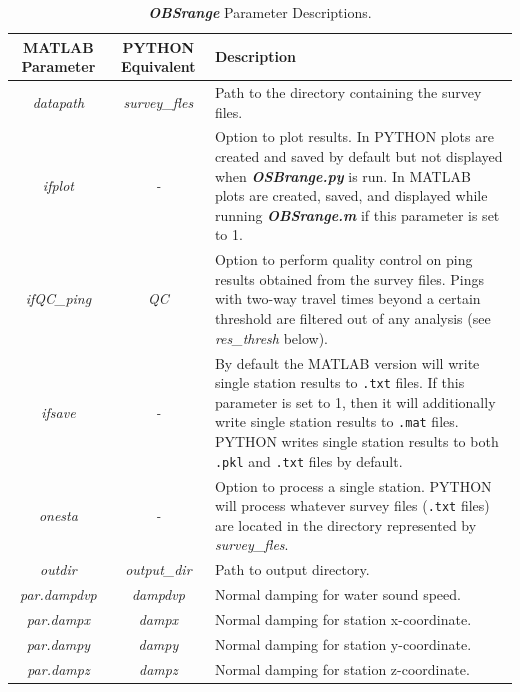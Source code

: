 \documentclass[titlepage, 12pt]{article}
\begin{document}
  \newpage
  \begin{table}[H]
   \centering
   \caption{\textbf{\textit{OBSrange}} Parameter Descriptions.}
   \label{table:params}
   \footnotesize
   \begin{tabularx}{\linewidth}{|c|c|X|}
    \hline
    \textbf{MATLAB Parameter}   & \textbf{PYTHON Equivalent} & \textbf{Description} \\ \hline
    \textit{datapath}           & \textit{survey\_fles}      & Path to the directory containing the survey files.\\ \hline
    \textit{ifplot}             & \textit{-}                 & Option to plot results. In PYTHON plots are created and saved by default but not displayed when \textbf{\textit{OSBrange.py}} is run. In MATLAB plots are created, saved, and displayed while running \textbf{\textit{OBSrange.m}} if this parameter is set to 1.\\ \hline
    \textit{ifQC\_ping}         & \textit{QC}                & Option to perform quality control on ping results obtained from the survey files. Pings with two-way travel times beyond a certain threshold are filtered out of any analysis (see \textit{res\_thresh} below).\\ \hline
    \textit{ifsave}             & \textit{-}                 & By default the MATLAB version will write single station results to \texttt{.txt} files. If this parameter is set to 1, then it will additionally write single station results to \texttt{.mat} files. PYTHON writes single station results to both \texttt{.pkl} and \texttt{.txt} files by default.\\ \hline
    \textit{onesta}             & \textit{-}                 & Option to process a single station. PYTHON will process whatever survey files (\texttt{.txt} files) are located in the directory represented by \textit{survey\_fles}.\\ \hline
    \textit{outdir}             & \textit{output\_dir}       & Path to output directory.\\ \hline
    \textit{par.dampdvp}        & \textit{dampdvp}           & Normal damping for water sound speed.\\ \hline
    \textit{par.dampx}          & \textit{dampx}             & Normal damping for station x-coordinate.\\ \hline
    \textit{par.dampy}          & \textit{dampy}             & Normal damping for station y-coordinate.\\ \hline
    \textit{par.dampz}          & \textit{dampz}             & Normal damping for station z-coordinate.\\ \hline

\end{tabularx}
\end{table}
\end{document}
